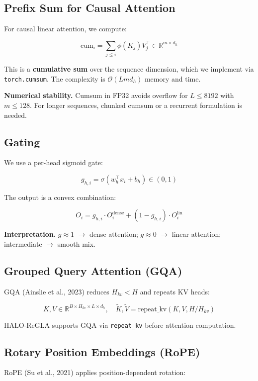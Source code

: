 \subsection{Prefix Sum for Causal Attention}

For causal linear attention, we compute:

\[
\text{cum}_i = \sum_{j \le i} \phi(K_j) V_j^\top \in \mathbb{R}^{m \times d_h}
\]

This is a \textbf{cumulative sum} over the sequence dimension, which we implement 
via \texttt{torch.cumsum}. The complexity is $\mathcal{O}(L m d_h)$ memory and time.

\textbf{Numerical stability.} Cumsum in FP32 avoids overflow for $L \le 8192$ 
with $m \le 128$. For longer sequences, chunked cumsum or a recurrent 
formulation is needed.

\subsection{Gating}

We use a per-head sigmoid gate:

\[
g_{h,i} = \sigma\!\left(w_h^\top x_i + b_h\right) \in (0, 1)
\]

The output is a convex combination:

\[
O_i = g_{h,i} \cdot O_i^\text{dense} + (1 - g_{h,i}) \cdot O_i^\text{lin}
\]

\textbf{Interpretation.} $g \approx 1$ $\to$ dense attention; $g \approx 0$ $\to$ linear 
attention; intermediate $\to$ smooth mix.

\subsection{Grouped Query Attention (GQA)}

GQA (Ainslie et al., 2023) reduces $H_{kv} < H$ and repeats KV heads:

\[
K, V \in \mathbb{R}^{B \times H_{kv} \times L \times d_h}, \quad
\tilde{K}, \tilde{V} = \text{repeat\_kv}(K, V, H / H_{kv})
\]

HALO-ReGLA supports GQA via \texttt{repeat\_kv} before attention computation.

\subsection{Rotary Position Embeddings (RoPE)}

RoPE (Su et al., 2021) applies position-dependent rotation:

